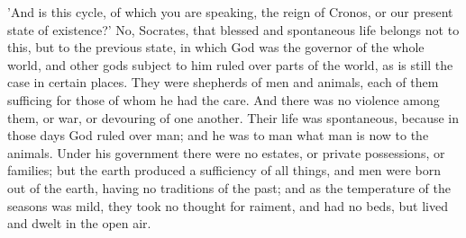 \documentclass[11pt,letter]{article}
\begin{document}
\par  'And is this cycle, of which you are speaking, the reign of Cronos, or our present state of existence?' No, Socrates, that blessed and spontaneous life belongs not to this, but to the previous state, in which God was the governor of the whole world, and other gods subject to him ruled over parts of the world, as is still the case in certain places. They were shepherds of men and animals, each of them sufficing for those of whom he had the care. And there was no violence among them, or war, or devouring of one another. Their life was spontaneous, because in those days God ruled over man; and he was to man what man is now to the animals. Under his government there were no estates, or private possessions, or families; but the earth produced a sufficiency of all things, and men were born out of the earth, having no traditions of the past; and as the temperature of the seasons was mild, they took no thought for raiment, and had no beds, but lived and dwelt in the open air.
\end{document}
